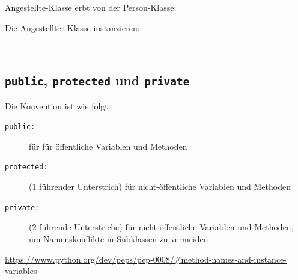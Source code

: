 \begin{minipage}[t]{0.49\textwidth}
	Angestellte-Klasse erbt von der Person-Klasse:\\
	
\end{minipage}
\hspace{0.02\textwidth}
\begin{minipage}[t]{0.49\textwidth}
	Die Angestellter-Klasse instanzieren:\\
	
\end{minipage}


\begin{minipage}[t]{0.49\textwidth}
	$\quad$\\[20pt]
	
	\subsection{\texttt{public}, \texttt{protected} und \texttt{private}}
	Die Konvention ist wie folgt:
	\begin{description}
		\item[\texttt{public:}] für für öffentliche Variablen und Methoden
		\item[\texttt{protected:}] (1 führender Unterstrich) für nicht-öffentliche Variablen und Methoden
		\item[\texttt{private:}] (2 führende Unterstriche) für nicht-öffentliche Variablen und Methoden, um Namenskonflikte in Subklassen zu vermeiden 
	\end{description}
	\url{https://www.python.org/dev/peps/pep-0008/#method-names-and-instance-variables}
\end{minipage}
\hspace{0.02\textwidth}
\begin{minipage}[t]{0.49\textwidth}
	
\end{minipage}


